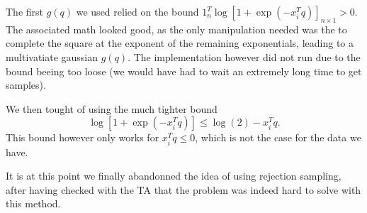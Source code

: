 \documentclass[a4paper, 12pt,oneside]{article}
\begin{document}
		The first $g(q)$ we used relied on the bound $1_{n}^T \log[1+\exp(-x_i^Tq)]_{n\times 1}>0$. The associated math looked good, as the only manipulation needed was the to complete the square at the exponent of the remaining exponentials, leading to a multivatiate gaussian $g(q)$. The implementation however did not run due to the bound beeing too loose (we would have had to wait an extremely long time to get samples).

		We then tought of using the much tighter bound  
		\begin{equation}
			\log[1+\exp(-x_i^Tq)] \le \log(2) - x_i^Tq.
		\end{equation}
		This bound however only works for $x_i^Tq\le 0$, which is not the case for the data we have. 
		
		It is at this point we finally abandonned the idea of using rejection sampling, after having checked with the TA that the problem was indeed hard to solve with this method.
\end{document}
